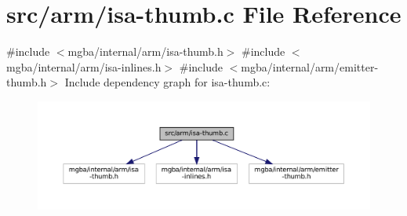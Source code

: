 \hypertarget{isa-thumb_8c}{}\section{src/arm/isa-\/thumb.c File Reference}
\label{isa-thumb_8c}
{\ttfamily \#include $<$mgba/internal/arm/isa-\/thumb.\+h$>$}\newline
{\ttfamily \#include $<$mgba/internal/arm/isa-\/inlines.\+h$>$}\newline
{\ttfamily \#include $<$mgba/internal/arm/emitter-\/thumb.\+h$>$}\newline
Include dependency graph for isa-\/thumb.c\+:
\nopagebreak
\begin{figure}[H]
\begin{center}
\leavevmode
\includegraphics[width=350pt]{isa-thumb_8c__incl}
\end{center}
\end{figure}
